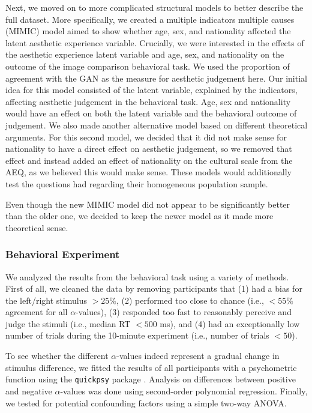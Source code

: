 \documentclass[../main.tex]{subfiles}
\begin{document}
	Next, we moved on to more complicated structural models to better describe the full dataset. More specifically, we created a multiple indicators multiple causes (MIMIC) model aimed to show whether age, sex, and nationality affected the latent aesthetic experience variable. Crucially, we were interested in the effects of the aesthetic experience latent variable and age, sex, and nationality on the outcome of the image comparison behavioral task. We used the proportion of agreement with the GAN as the measure for aesthetic judgement here. Our initial idea for this model consisted of the latent variable, explained by the indicators, affecting aesthetic judgement in the behavioral task. Age, sex and nationality would have an effect on both the latent variable and the behavioral outcome of judgement. We also made another alternative model based on different theoretical arguments. For this second model, we decided that it did not make sense for nationality to have a direct effect on aesthetic judgement, so we removed that effect and instead added an effect of nationality on the cultural scale from the AEQ, as we believed this would make sense. These models would additionally test the questions \textcite{wanzerExperiencingFlowViewing2020} had regarding their homogeneous population sample. 
	
	Even though the new MIMIC model did not appear to be significantly better than the older one, we decided to keep the newer model as it made more theoretical sense.
	
	
	
	\subsubsection{Behavioral Experiment}
	We analyzed the results from the behavioral task using a variety of methods. First of all, we cleaned the data by removing participants that (1) had a bias for the left/right stimulus $>25\%$, (2) performed too close to chance (i.e., $<55\%$ agreement for all $\alpha$-values), (3) responded too fast to reasonably perceive and judge the stimuli (i.e., median RT $<500$ ms), and (4) had an exceptionally low number of trials during the 10-minute experiment (i.e., number of trials $<50$).
	
	To see whether the different $\alpha$-values indeed represent a gradual change in stimulus difference, we fitted the results of all participants with a psychometric function using the \texttt{quickpsy} package \parencite{linares2016quickpsy}. Analysis on differences between positive and negative $\alpha$-values was done using second-order polynomial regression. Finally, we tested for potential confounding factors using a simple two-way ANOVA.
	
\end{document}

